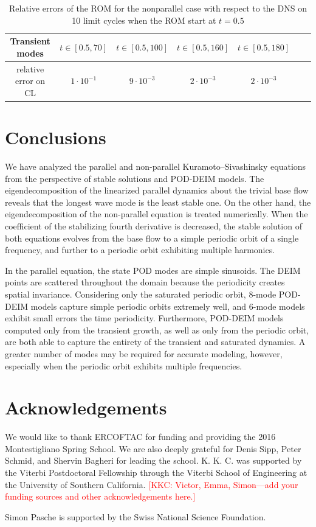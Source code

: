 \documentclass[11pt]{article}
\newcommand{\KSE}{Kuramoto--Sivashinsky equation}
\newcommand{\kkc}[1]{\textcolor{red}{[KKC: #1]}}
\begin{document}
\begin{table}[!ht]
\begin{center}
\begin{tabular}{ c || c | c | c | c | c |c|}
 Transient modes  & $t\in[0.5,70]$ & $t\in[0.5,100]$ & $t\in[0.5,160]$ & $t\in[0.5,180]$\\ \hline
 relative error on CL & $1\cdot 10^{-1}$ & $9\cdot 10^{-3}$ & $2\cdot 10^{-3}$  & $2\cdot 10^{-3}$ \\ \hline
\hline
\end{tabular}
\caption{Relative errors of the ROM for the nonparallel case with respect to the DNS on 10 limit cycles when the ROM start at $t=0.5$\label{tab:errorcyclenon}}
\end{center}
\end{table}

\section{Conclusions}
\label{sec:conclusions}

We have analyzed the parallel and non-parallel {\KSE}s from the perspective of stable solutions and POD-DEIM models.
The eigendecomposition of the linearized parallel dynamics about the trivial base flow reveals that the longest wave mode is the least stable one.
On the other hand, the eigendecomposition of the non-parallel equation is treated numerically.
When the coefficient of the stabilizing fourth derivative is decreased, the stable solution of both equations evolves from the base flow to a simple periodic orbit of a single frequency, and further to a periodic orbit exhibiting multiple harmonics.

In the parallel equation, the state POD modes are simple sinusoids.
The DEIM points are scattered throughout the domain because the periodicity creates spatial invariance.
Considering only the saturated periodic orbit, 8-mode POD-DEIM models capture simple periodic orbits extremely well, and 6-mode models exhibit small errors the time periodicity.
Furthermore, POD-DEIM models computed only from the transient growth, as well as only from the periodic orbit, are both able to capture the entirety of the transient and saturated dynamics.
A greater number of modes may be required for accurate modeling, however, especially when the periodic orbit exhibits multiple frequencies.

\section{Acknowledgements}

We would like to thank ERCOFTAC for funding and providing the 2016 Montestigliano Spring School.
We are also deeply grateful for Denis Sipp, Peter Schmid, and Shervin Bagheri for leading the school.
K. K. C. was supported by the Viterbi Postdoctoral Fellowship through the Viterbi School of Engineering at the University of Southern California.
\kkc{Victor, Emma, Simon---add your funding sources and other acknowledgements here.}

Simon Pasche is supported by the Swiss National Science Foundation.


\end{document}
